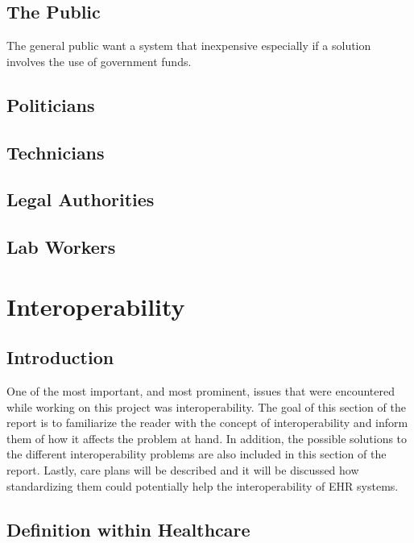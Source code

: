 \documentclass[14pt]{article}
\begin{document}
\subsection{The Public}
The general public want a system that inexpensive especially if a solution involves the use of government funds.
\subsection{Politicians}
\subsection{Technicians}
\subsection{Legal Authorities}
\subsection{Lab Workers}

\newpage

\section{Interoperability}
\label{sec:Interoperability}

\subsection{Introduction} 

One of the most important, and most prominent, issues that were encountered while working on this project was interoperability.  The goal of this section of the report is to familiarize the reader with the concept of interoperability and inform them of how it affects the problem at hand.  In addition, the possible solutions to the different interoperability problems are also included in this section of the report.  Lastly, care plans will be described and it will be discussed how standardizing them could potentially help the interoperability of \gls{EHR} systems.

\subsection{Definition within Healthcare} 

\end{document}
